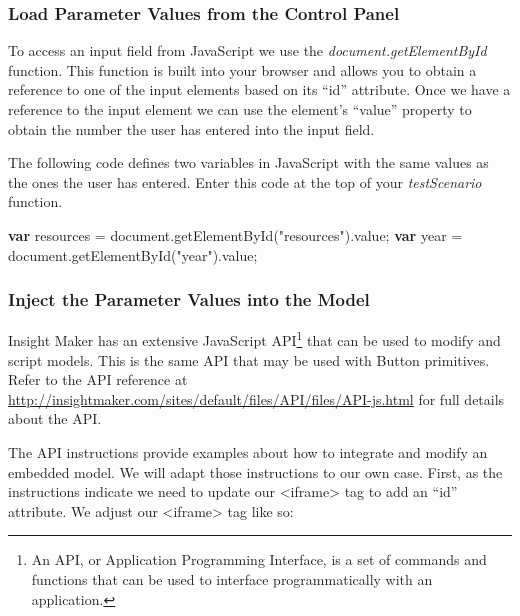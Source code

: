\documentclass[]{memoir}
\newenvironment{Shaded}{}{}
\newcommand{\KeywordTok}[1]{\textcolor[rgb]{0.00,0.44,0.13}{\textbf{{#1}}}}
\newcommand{\StringTok}[1]{\textcolor[rgb]{0.25,0.44,0.63}{{#1}}}
\newcommand{\OtherTok}[1]{\textcolor[rgb]{0.00,0.44,0.13}{{#1}}}
\newcommand{\FunctionTok}[1]{\textcolor[rgb]{0.02,0.16,0.49}{{#1}}}
\newcommand{\NormalTok}[1]{{#1}}
\begin{document}
\subsubsection{Load Parameter Values from the Control Panel}

To access an input field from JavaScript we use the
\emph{document.getElementById} function. This function is built into
your browser and allows you to obtain a reference to one of the input
elements based on its ``id'' attribute. Once we have a reference to the
input element we can use the element's ``value'' property to obtain the
number the user has entered into the input field.

The following code defines two variables in JavaScript with the same
values as the ones the user has entered. Enter this code at the top of
your \emph{testScenario} function.

\begin{Shaded}
\begin{Highlighting}[]
\KeywordTok{var} \NormalTok{resources = }\OtherTok{document}\NormalTok{.}\FunctionTok{getElementById}\NormalTok{(}\StringTok{"resources"}\NormalTok{).}\FunctionTok{value}\NormalTok{;}
\KeywordTok{var} \NormalTok{year = }\OtherTok{document}\NormalTok{.}\FunctionTok{getElementById}\NormalTok{(}\StringTok{"year"}\NormalTok{).}\FunctionTok{value}\NormalTok{;}
\end{Highlighting}
\end{Shaded}

\subsubsection{Inject the Parameter Values into the Model}

Insight Maker has an extensive JavaScript API\footnote{An API, or
  Application Programming Interface, is a set of commands and functions
  that can be used to interface programmatically with an application.}
that can be used to modify and script models. This is the same API that
may be used with Button primitives. Refer to the API reference at
\url{http://insightmaker.com/sites/default/files/API/files/API-js.html}
for full details about the API.

The API instructions provide examples about how to integrate and modify
an embedded model. We will adapt those instructions to our own case.
First, as the instructions indicate we need to update our
\textless{}iframe\textgreater{} tag to add an ``id'' attribute. We
adjust our \textless{}iframe\textgreater{} tag like so:
\end{document}
